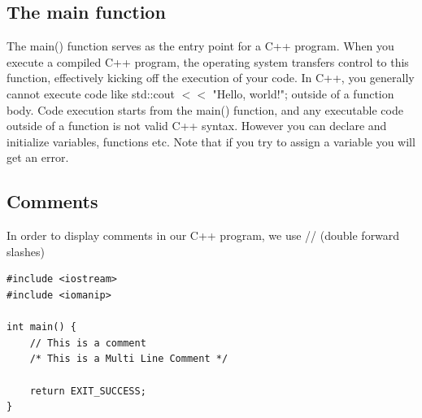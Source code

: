 \documentclass{report}
\begin{document}
    \bigbreak \noindent 
    \subsection{The main function}
    \bigbreak \noindent 
    The main() function serves as the entry point for a C++ program. When you execute a compiled C++ program, the operating system transfers control to this function, effectively kicking off the execution of your code.
    \bigbreak \noindent 
    In C++, you generally cannot execute code like std::cout $<<$ "Hello, world!"; outside of a function body. Code execution starts from the main() function, and any executable code outside of a function is not valid C++ syntax. However you can declare and initialize variables, functions etc. Note that if you try to assign a variable you will get an error. 

    \bigbreak \noindent 
    \subsection{Comments}
    In order to display comments in our C++ program, we use // (double forward slashes)
    \bigbreak \noindent 
    \sepline
    \begin{verbatim}
#include <iostream> 
#include <iomanip>

int main() {
    // This is a comment
    /* This is a Multi Line Comment */

    return EXIT_SUCCESS;
}
    \end{verbatim}
    \sepline

    \pagebreak \bigbreak \noindent 
\end{document}
